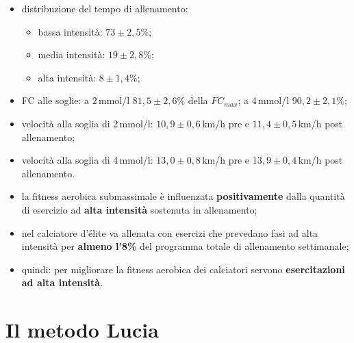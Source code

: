 \begin{itemize}
  \item distribuzione del tempo di allenamento:
    \begin{itemize}
      \item bassa intensità: $73 \pm 2{,}5\%$;
      \item media intensità: $19 \pm 2{,}8\%$;
      \item alta intensità: $8 \pm 1{,}4\%$;
    \end{itemize}
  \item FC alle soglie: a 2\,mmol/l $81{,}5 \pm 2{,}6\%$ della $FC_{max}$; a 4\,mmol/l
    $90{,}2 \pm 2{,}1\%$;
  \item velocità alla soglia di 2\,mmol/l: $10{,}9 \pm 0{,}6$\,km/h pre e $11{,}4 \pm 0{,}5$\,km/h
    post allenamento;
  \item velocità alla soglia di 4\,mmol/l: $13{,}0 \pm 0{,}8$\,km/h pre e $13{,}9 \pm 0{,}4$\,km/h
    post allenamento.
\end{itemize}

\begin{itemize}
  \item la fitness aerobica submassimale è influenzata \textbf{positivamente} dalla quantità di
    esercizio ad \textbf{alta intensità} sostenuta in allenamento;
  \item nel calciatore d'élite va allenata con esercizi che prevedano fasi ad alta intensità per
    \textbf{almeno l'8\%} del programma totale di allenamento settimanale;
  \item quindi: per migliorare la fitness aerobica dei calciatori servono \textbf{esercitazioni ad
    alta intensità}.
\end{itemize}

\section{Il metodo Lucia}

